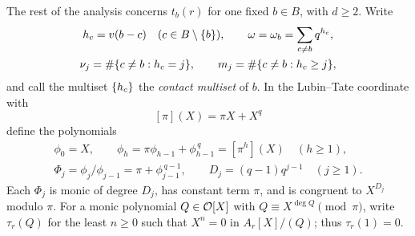 The rest of the analysis concerns $t_b(r)$ for one fixed $b\in B$, with $d\ge2$. Write
\begin{equation}\label{lub:eq:contacts}
\begin{gathered}
 h_c=v(b-c)\quad(c\in B\setminus\{b\}),\qquad
 \omega=\omega_b=\sum_{c\ne b}q^{h_c},\\
 \nu_j=\#\{c\ne b: h_c=j\},\qquad
 m_j=\#\{c\ne b: h_c\ge j\},
\end{gathered}
\end{equation}
and call the multiset $\{h_c\}$ the \emph{contact multiset} of $b$. In the Lubin--Tate
coordinate with
\begin{equation}\label{lub:eq:coordinate}
 [\pi](X)=\pi X+X^q
\end{equation}
define the polynomials
\begin{equation}\label{lub:eq:iterates}
\begin{gathered}
 \phi_0=X,\qquad \phi_h=\pi\phi_{h-1}+\phi_{h-1}^{\,q}=[\pi^h](X)\quad(h\ge1),\\
 \Phi_j=\phi_j/\phi_{j-1}=\pi+\phi_{j-1}^{\,q-1},\qquad D_j=(q-1)q^{j-1}\quad(j\ge1).
\end{gathered}
\end{equation}
Each $\Phi_j$ is monic of degree $D_j$, has constant term $\pi$, and is congruent to
$X^{D_j}$ modulo $\pi$. For a monic polynomial $Q\in\mathcal{O}[X]$ with
$Q\equiv X^{\deg Q}\pmod\pi$, write $\tau_r(Q)$ for the least $n\ge0$ such that $X^n=0$ in
$A_r[X]/(Q)$; thus $\tau_r(1)=0$.

